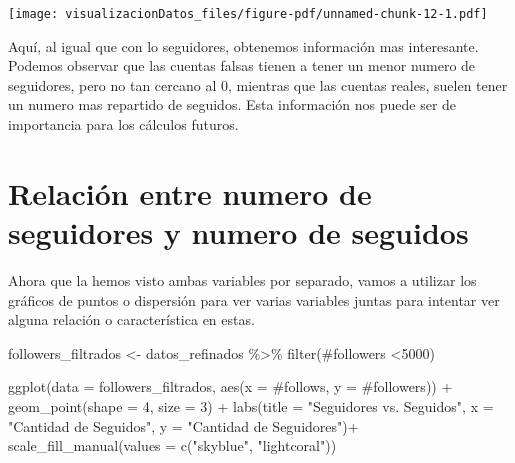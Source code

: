 \documentclass[
  letterpaper,
  DIV=11,
  numbers=noendperiod]{scrreprt}
\newenvironment{Shaded}{\begin{snugshade}}{\end{snugshade}}
\newcommand{\AttributeTok}[1]{\textcolor[rgb]{0.40,0.45,0.13}{#1}}
\newcommand{\DecValTok}[1]{\textcolor[rgb]{0.68,0.00,0.00}{#1}}
\newcommand{\FunctionTok}[1]{\textcolor[rgb]{0.28,0.35,0.67}{#1}}
\newcommand{\NormalTok}[1]{\textcolor[rgb]{0.00,0.23,0.31}{#1}}
\newcommand{\OtherTok}[1]{\textcolor[rgb]{0.00,0.23,0.31}{#1}}
\newcommand{\SpecialCharTok}[1]{\textcolor[rgb]{0.37,0.37,0.37}{#1}}
\newcommand{\StringTok}[1]{\textcolor[rgb]{0.13,0.47,0.30}{#1}}
\begin{document}
\texttt{[image: visualizacionDatos\_files/figure-pdf/unnamed-chunk-12-1.pdf]}

Aquí, al igual que con lo seguidores, obtenemos información mas
interesante. Podemos observar que las cuentas falsas tienen a tener un
menor numero de seguidores, pero no tan cercano al 0, mientras que las
cuentas reales, suelen tener un numero mas repartido de seguidos. Esta
información nos puede ser de importancia para los cálculos futuros.

\section{Relación entre numero de seguidores y numero de
seguidos}\label{relaciuxf3n-entre-numero-de-seguidores-y-numero-de-seguidos}

Ahora que la hemos visto ambas variables por separado, vamos a utilizar
los gráficos de puntos o dispersión para ver varias variables juntas
para intentar ver alguna relación o característica en estas.

\begin{Shaded}
\begin{Highlighting}[]
\NormalTok{followers\_filtrados }\OtherTok{\textless{}{-}}\NormalTok{ datos\_refinados }\SpecialCharTok{\%\textgreater{}\%}  \FunctionTok{filter}\NormalTok{(}\StringTok{\textasciigrave{}}\AttributeTok{\#followers}\StringTok{\textasciigrave{}} \SpecialCharTok{\textless{}}\DecValTok{5000}\NormalTok{)}


\FunctionTok{ggplot}\NormalTok{(}\AttributeTok{data =}\NormalTok{ followers\_filtrados, }\FunctionTok{aes}\NormalTok{(}\AttributeTok{x =} \StringTok{\textasciigrave{}}\AttributeTok{\#follows}\StringTok{\textasciigrave{}}\NormalTok{, }\AttributeTok{y =} \StringTok{\textasciigrave{}}\AttributeTok{\#followers}\StringTok{\textasciigrave{}}\NormalTok{)) }\SpecialCharTok{+}
  \FunctionTok{geom\_point}\NormalTok{(}\AttributeTok{shape =} \DecValTok{4}\NormalTok{, }\AttributeTok{size =} \DecValTok{3}\NormalTok{) }\SpecialCharTok{+}
  \FunctionTok{labs}\NormalTok{(}\AttributeTok{title =} \StringTok{"Seguidores vs. Seguidos"}\NormalTok{,}
       \AttributeTok{x =} \StringTok{"Cantidad de Seguidos"}\NormalTok{,}
       \AttributeTok{y =} \StringTok{"Cantidad de Seguidores"}\NormalTok{)}\SpecialCharTok{+}
  \FunctionTok{scale\_fill\_manual}\NormalTok{(}\AttributeTok{values =} \FunctionTok{c}\NormalTok{(}\StringTok{"skyblue"}\NormalTok{, }\StringTok{"lightcoral"}\NormalTok{))}
\end{Highlighting}
\end{Shaded}
\end{document}
